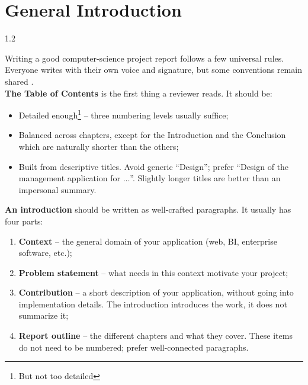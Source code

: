\chapter*{General Introduction}
\begin{spacing}{1.2}

Writing a good computer-science project report \cite{SFAXI2015} follows a few
universal rules. Everyone writes with their own voice and signature, but some
conventions remain shared \cite{Latex}.\\

\textbf{The Table of Contents} is the first thing a reviewer reads. It should
be:
\begin{itemize}
  \item Detailed enough\footnote{But not too detailed} -- three numbering levels
        usually suffice;
  \item Balanced across chapters, except for the Introduction and the
        Conclusion which are naturally shorter than the others;
  \item Built from descriptive titles. Avoid generic ``Design''; prefer
        ``Design of the management application for $\ldots$''. Slightly longer
        titles are better than an impersonal summary.\\
\end{itemize}

\textbf{An introduction} should be written as well-crafted paragraphs.
It usually has four parts:
\begin{enumerate}
  \item \textbf{Context} -- the general domain of your application (web, BI,
        enterprise software, etc.);
  \item \textbf{Problem statement} -- what needs in this context motivate your
        project;
  \item \textbf{Contribution} -- a short description of your application,
        without going into implementation details. The introduction introduces
        the work, it does not summarize it;
  \item \textbf{Report outline} -- the different chapters and what they cover.
        These items do not need to be numbered; prefer well-connected
        paragraphs.
\end{enumerate}

\end{spacing}
